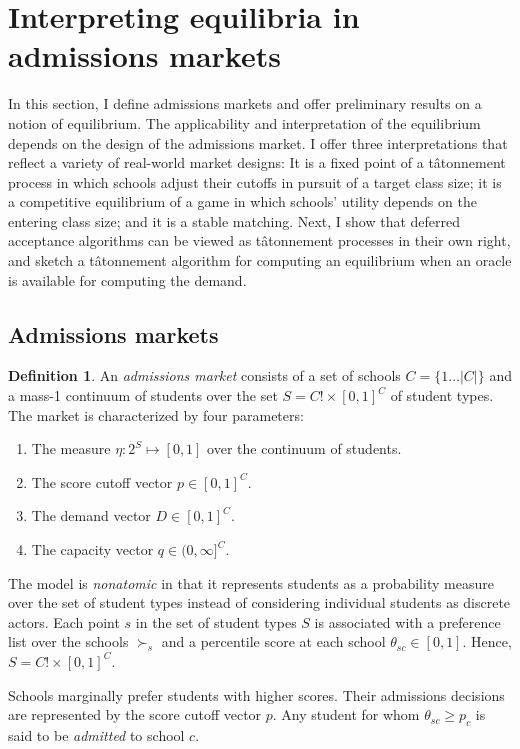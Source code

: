 \documentclass[12pt]{article}
\numberwithin{equation}{subsection}
\theoremstyle{definition}
\newtheorem{definition}{Definition}
\begin{document}
\section{Interpreting equilibria in admissions markets} \label{interpeqinadmmkts}
In this section, I define admissions markets and offer preliminary results on a notion of equilibrium. The applicability and interpretation of the equilibrium depends on the design of the admissions market. I offer three interpretations that reflect a variety of real-world market designs: It is a fixed point of a t\^{a}tonnement process in which schools adjust their cutoffs in pursuit of a target class size; it is a competitive equilibrium of a game in which schools' utility depends on the entering class size; and it is a stable matching. Next, I show that deferred acceptance algorithms can be viewed as t\^{a}tonnement processes in their own right, and sketch a t\^{a}tonnement algorithm for computing an equilibrium when an oracle is available for computing the demand.

\subsection{Admissions markets}
\begin{definition} An \emph{admissions market} consists of a set of schools $C = \{ 1\dots |C| \}$ and a mass-1 continuum of students over the set $S = C! \times [0, 1]^C$ of student types. The market is characterized by four parameters:
\begin{enumerate}
\item The measure $\eta: 2^S \mapsto [0, 1]$ over the continuum of students.
\item The score cutoff vector $p \in [0, 1]^C$. 
\item The demand vector $D \in [0, 1]^C$.
\item The capacity vector $q \in (0, \infty]^C$.
\end{enumerate}
\end{definition}

The model is \emph{nonatomic} in that it represents students as a probability measure over the set of student types instead of considering individual students as discrete actors. Each point $s$ in the set of student types $S$ is associated with a preference list over the schools $\succ_s$ and a percentile score at each school $\theta_{sc} \in [0,1]$. Hence, $S = C! \times [0, 1]^C$. 

Schools marginally prefer students with higher scores. Their admissions decisions are represented by the score cutoff vector $p$. Any student for whom $\theta_{sc} \geq p_c$ is said to be \emph{admitted} to school $c$. 
\end{document}
